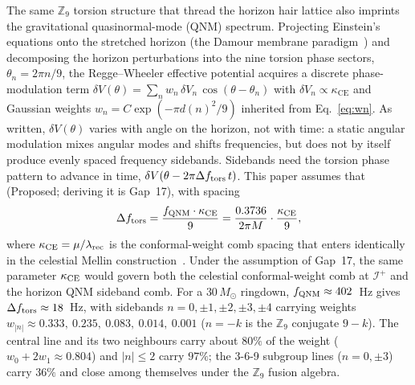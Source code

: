 \documentclass[11pt,a4paper]{article}
\begin{document}
The same $\mathbb{Z}_9$ torsion structure that thread the horizon hair lattice
also imprints the gravitational quasinormal-mode (QNM) spectrum. Projecting
Einstein's equations onto the stretched horizon (the Damour membrane
paradigm~\cite{Damour1978}) and decomposing the horizon perturbations into the
nine torsion phase sectors, $\theta_n = 2\pi n / 9$, the Regge--Wheeler
effective potential acquires a discrete phase-modulation term
$\delta V(\theta) = \sum_n w_n\,\delta V_n\,\cos(\theta - \theta_n)$ with
$\delta V_n \propto \kappa_{\mathrm{CE}}$ and Gaussian weights
$w_n = C\exp(-\pi d(n)^2/9)$ inherited from Eq.~\eqref{eq:wn}. As written, $\delta V(\theta)$ varies with
angle on the horizon, not with time: a static angular modulation mixes angular
modes and shifts frequencies, but does not by itself produce evenly spaced
frequency sidebands. Sidebands need the torsion phase pattern to advance in time,
$\delta V(\theta - 2\pi\Delta f_{\rm tors}\,t)$. This paper assumes that
(Proposed; deriving it is Gap~17), with spacing
\begin{equation}
  \Delta f_{{\rm tors}} = \frac{f_{\rm QNM} \cdot \kappa_{\rm CE}}{9}
    = \frac{0.3736}{2\pi M} \cdot \frac{\kappa_{\rm CE}}{9},
  \label{eq:sideband_spacing}
\end{equation}
where $\kappa_{\rm CE} = \mu/\lambda_{\rm rec}$ is the conformal-weight comb
spacing that enters identically in the celestial Mellin
construction~\cite{BresslerCH2026,BresslerMellin2026}. Under the assumption of Gap~17, the same parameter $\kappa_{\rm CE}$
would govern both the celestial conformal-weight comb at $\mathscr{I}^+$ and the
horizon QNM sideband comb. For a $30\,M_\odot$ ringdown, $f_{\rm QNM}\approx
402$~Hz gives $\Delta f_{\rm tors} \approx 18$~Hz, with sidebands
$n = 0, \pm1, \pm2, \pm3, \pm4$ carrying weights
$w_{|n|} \approx 0.333,\ 0.235,\ 0.083,\ 0.014,\ 0.001$ ($n = -k$ is the
$\mathbb{Z}_9$ conjugate $9-k$). The central line and its two neighbours carry
about $80\%$ of the weight ($w_0 + 2w_1 \approx 0.804$) and $|n| \le 2$ carry
$97\%$; the 3-6-9 subgroup lines ($n = 0, \pm 3$) carry $36\%$ and close among
themselves under the $\mathbb{Z}_9$ fusion algebra.
\end{document}
